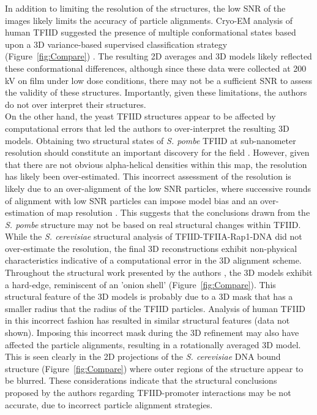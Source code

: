 \indent In addition to limiting the resolution of the structures, the low SNR of the images likely limits the accuracy of particle alignments. Cryo-EM analysis of human TFIID suggested the presence of multiple conformational states based upon a 3D variance-based supervised classification strategy (Figure~\ref{fig:Compare}) \cite{Grob_1281}. The resulting 2D averages and 3D models likely reflected these conformational differences, although since these data were collected at 200 kV on film under low dose conditions, there may not be a sufficient SNR to assess the validity of these structures. Importantly, given these limitations, the authors do not over interpret their structures. \\
\indent On the other hand, the yeast TFIID structures \cite{Elmlund_691,Papai_539} appear to be affected by computational errors that led the authors to over-interpret the resulting 3D models. Obtaining two structural states of \emph{S. pombe} TFIID at sub-nanometer resolution should constitute an important discovery for the field \cite{Elmlund_691}. However, given that there are not obvious alpha-helical densities within this map, the resolution has likely been over-estimated. This incorrect assessment of the resolution is likely due to an over-alignment of the low SNR particles, where successive rounds of alignment with low SNR particles can impose model bias and an over-estimation of map resolution \cite{Stewart_2004}. This suggests that the conclusions drawn from the \emph{S. pombe} structure may not be based on real structural changes within TFIID. \\
\indent While the \emph{S. cerevisiae} structural analysis of TFIID-TFIIA-Rap1-DNA did not over-estimate the resolution, the final 3D reconstructions exhibit non-physical characteristics indicative of a computational error in the 3D alignment scheme. Throughout the structural work presented by the authors \cite{Papai_539,Papai_418}, the 3D models exhibit a hard-edge, reminiscent of an 'onion shell' (Figure~\ref{fig:Compare}). This structural feature of the 3D models is probably due to a 3D mask that has a smaller radius that the radius of the TFIID particles. Analysis of human TFIID in this incorrect fashion has resulted in similar structural features (data not shown). Imposing this incorrect mask during the 3D refinement may also have affected the particle alignments, resulting in a rotationally averaged 3D model. This is seen clearly in the 2D projections of the \emph{S. cerevisiae} DNA bound structure (Figure~\ref{fig:Compare}) where outer regions of the structure appear to be blurred. These considerations indicate that the structural conclusions proposed by the authors regarding TFIID-promoter interactions may be not accurate, due to incorrect particle alignment strategies.\\

